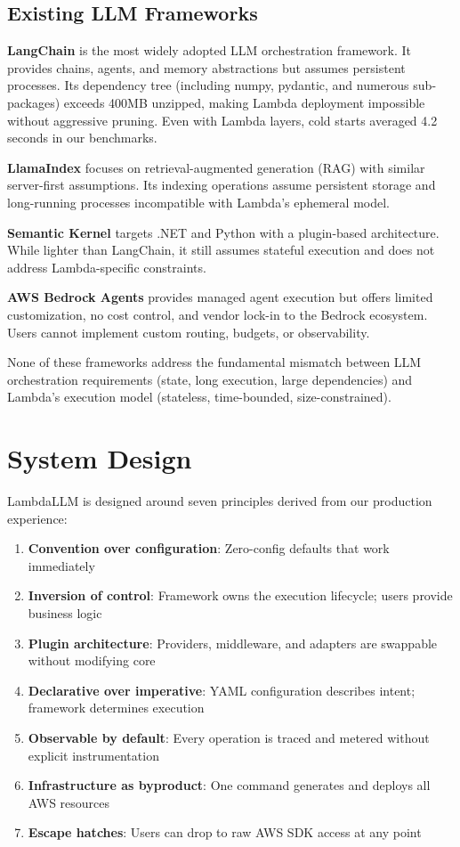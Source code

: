 \documentclass[11pt,a4paper]{article}
\begin{document}
\subsection{Existing LLM Frameworks}

\textbf{LangChain} \cite{langchain} is the most widely adopted LLM orchestration framework. It provides chains, agents, and memory abstractions but assumes persistent processes. Its dependency tree (including numpy, pydantic, and numerous sub-packages) exceeds 400MB unzipped, making Lambda deployment impossible without aggressive pruning. Even with Lambda layers, cold starts averaged 4.2 seconds in our benchmarks.

\textbf{LlamaIndex} \cite{llamaindex} focuses on retrieval-augmented generation (RAG) with similar server-first assumptions. Its indexing operations assume persistent storage and long-running processes incompatible with Lambda's ephemeral model.

\textbf{Semantic Kernel} \cite{semantickernel} targets .NET and Python with a plugin-based architecture. While lighter than LangChain, it still assumes stateful execution and does not address Lambda-specific constraints.

\textbf{AWS Bedrock Agents} provides managed agent execution but offers limited customization, no cost control, and vendor lock-in to the Bedrock ecosystem. Users cannot implement custom routing, budgets, or observability.

None of these frameworks address the fundamental mismatch between LLM orchestration requirements (state, long execution, large dependencies) and Lambda's execution model (stateless, time-bounded, size-constrained).

\section{System Design}

LambdaLLM is designed around seven principles derived from our production experience:

\begin{enumerate}
    \item \textbf{Convention over configuration}: Zero-config defaults that work immediately
    \item \textbf{Inversion of control}: Framework owns the execution lifecycle; users provide business logic
    \item \textbf{Plugin architecture}: Providers, middleware, and adapters are swappable without modifying core
    \item \textbf{Declarative over imperative}: YAML configuration describes intent; framework determines execution
    \item \textbf{Observable by default}: Every operation is traced and metered without explicit instrumentation
    \item \textbf{Infrastructure as byproduct}: One command generates and deploys all AWS resources
    \item \textbf{Escape hatches}: Users can drop to raw AWS SDK access at any point
\end{enumerate}
\end{document}
